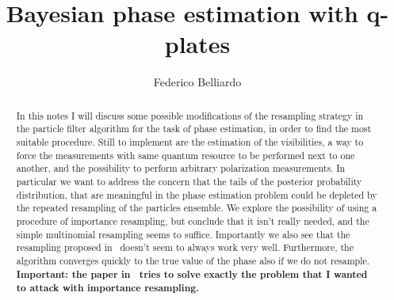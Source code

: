 \documentclass[aps, pra, 10pt, twocolumn, superscriptaddress,floatfix]{revtex4-1}
\begin{document}
%
\title{Bayesian phase estimation with q-plates}

\begin{abstract}
	In this notes I will discuss some possible modifications of the resampling strategy in the particle filter algorithm for the task of phase estimation, in order to find the most suitable procedure. Still to implement are the estimation of the visibilities, a way to force the measurements with same quantum resource to be performed next to one another, and the possibility to perform arbitrary polarization measurements. In particular we want to address the concern that the tails of the posterior probability distribution, that are meaningful in the phase estimation problem could be depleted by the repeated resampling of the particles ensemble. We explore the possibility of using a procedure of importance resampling, but conclude that it isn't really needed, and the simple multinomial resampling seems to suffice. Importantly we also see that the resampling proposed in~\cite{Granade2012} doesn't seem to always work very well. Furthermore, the algorithm converges quickly to the true value of the phase also if we do not resample. \textbf{Important: the paper in~\cite{Wiebe2020} tries to solve exactly the problem that I wanted to attack with importance resampling.}
\end{abstract} 
%

\author{Federico Belliardo}

\maketitle
\end{document}

